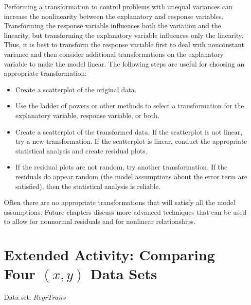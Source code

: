 \documentclass[
]{report}
\providecommand{\tightlist}{%
  \setlength{\itemsep}{0pt}\setlength{\parskip}{0pt}}
\begin{document}
Performing a transformation to control problems with unequal variances can increase the nonlinearity between the explanatory and response variables. Transforming the response variable influences both the variation and the linearity, but transforming the explanatory variable influences only the linearity. Thus, it is best to transform the response variable first to deal with nonconstant variance and then consider additional transformations on the explanatory variable to make the model linear. The following steps are useful for choosing an appropriate transformation:

\begin{itemize}
\tightlist
\item
  Create a scatterplot of the original data.
\item
  Use the ladder of powers or other methods to select a transformation for the explanatory variable, response variable, or both.
\item
  Create a scatterplot of the transformed data. If the scatterplot is not linear, try a new transformation. If the scatterplot is linear, conduct the appropriate statistical analysis and create residual plots.
\item
  If the residual plots are not random, try another transformation. If the residuals do appear random (the model assumptions about the error term are satisfied), then the statistical analysis is reliable.
\end{itemize}

Often there are no appropriate transformations that will satisfy all the model assumptions. Future chapters discuss more advanced techniques that can be used to allow for nonnormal residuals and for nonlinear relationships.

\hypertarget{extended-activity-comparing-four-x-y-data-sets}{%
\section*{\texorpdfstring{Extended Activity: Comparing Four \((x, y)\) Data Sets}{Extended Activity: Comparing Four (x, y) Data Sets}}\label{extended-activity-comparing-four-x-y-data-sets}}

Data set: \(RegrTrans\)
\end{document}
